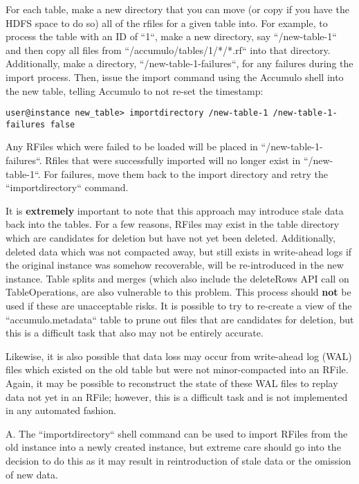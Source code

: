 For each table, make a new directory that you can move (or copy if you have the HDFS space to do so)
all of the rfiles for a given table into. For example, to process the table with an ID of ``1``, make a new directory, 
say ``/new-table-1`` and then copy all files from ``/accumulo/tables/1/*/*.rf`` into that directory. Additionally,
make a directory, ``/new-table-1-failures``, for any failures during the import process. Then, issue the import
command using the Accumulo shell into the new table, telling Accumulo to not re-set the timestamp:

\small
\begin{verbatim}
user@instance new_table> importdirectory /new-table-1 /new-table-1-failures false
\end{verbatim}
\normalsize

Any RFiles which were failed to be loaded will be placed in ``/new-table-1-failures``. Rfiles that were successfully
imported will no longer exist in ``/new-table-1``. For failures, move them back to the import directory and retry
the ``importdirectory`` command.

It is \textbf{extremely} important to note that this approach may introduce stale data back into
the tables. For a few reasons, RFiles may exist in the table directory which are candidates for deletion but have
not yet been deleted. Additionally, deleted data which was not compacted away, but still exists in write-ahead logs if
the original instance was somehow recoverable, will be re-introduced in the new instance. Table splits and merges
(which also include the deleteRows API call on TableOperations, are also vulnerable to this problem. This process should
\textbf{not} be used if these are unacceptable risks. It is possible to try to re-create a view of the ``accumulo.metadata``
table to prune out files that are candidates for deletion, but this is a difficult task that also may not be entirely accurate.

Likewise, it is also possible that data loss may occur from write-ahead log (WAL) files which existed on the old table but
were not minor-compacted into an RFile. Again, it may be possible to reconstruct the state of these WAL files to
replay data not yet in an RFile; however, this is a difficult task and is not implemented in any automated fashion.

A. The ``importdirectory`` shell command can be used to import RFiles from the old instance into a newly created instance,
but extreme care should go into the decision to do this as it may result in reintroduction of stale data or the
omission of new data.

